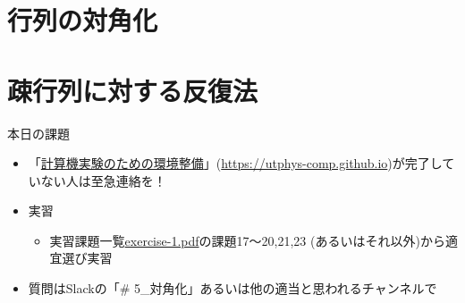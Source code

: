 \documentclass[10pt,dvipdfmx]{beamer}
\begin{document}
\section{行列の対角化}



\section{疎行列に対する反復法}
















\begin{frame}[t]{本日の課題}
  \begin{itemize}
  \item 「\href{https://utphys-comp.github.io}{計算機実験のための環境整備}」({\small \href{https://utphys-comp.github.io}{https://utphys-comp.github.io}})が完了していない人は至急連絡を！
  \item 実習
    \begin{itemize}
    \item 実習課題一覧\href{https://github.com/todo-group/ComputerExperiments/releases/tag/2020s-computer1}{exercise-1.pdf}の課題17〜20,21,23 (あるいはそれ以外)から適宜選び実習
    \end{itemize}
  \item 質問はSlackの「\# 5\_対角化」あるいは他の適当と思われるチャンネルで \\[2em]
  \end{itemize}
\end{frame}
\end{document}
